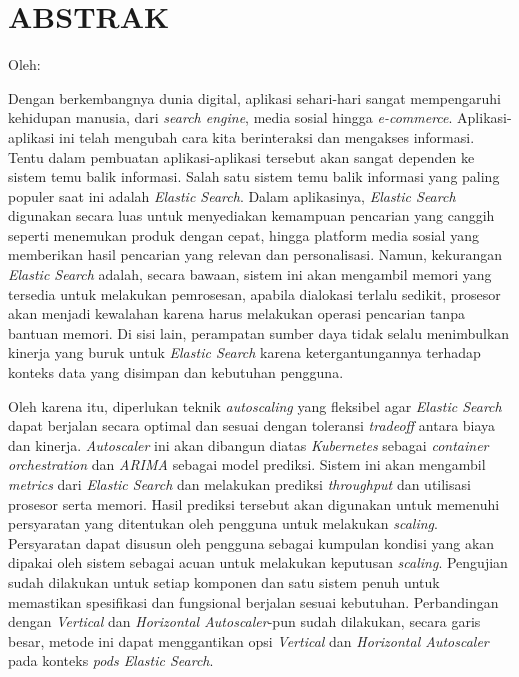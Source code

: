 \clearpage
\chapter*{ABSTRAK}
\begin{center}
    \center
    \begin{singlespace}
      \large\bfseries\MakeUppercase{\thetitle}
  
      \normalfont\normalsize
      Oleh:
  
      \bfseries \theauthor
    \end{singlespace}
\end{center} 

\begin{singlespace}
    \small
    Dengan berkembangnya dunia digital, aplikasi sehari-hari sangat mempengaruhi kehidupan manusia, dari \textit{search engine}, media sosial hingga \textit{e-commerce}. Aplikasi-aplikasi ini telah mengubah cara kita berinteraksi dan mengakses informasi. Tentu dalam pembuatan aplikasi-aplikasi tersebut akan sangat dependen ke sistem temu balik informasi. Salah satu sistem temu balik informasi yang paling populer saat ini adalah \textit{Elastic Search}. Dalam aplikasinya, \textit{Elastic Search} digunakan secara luas untuk menyediakan kemampuan pencarian yang canggih seperti menemukan produk dengan cepat, hingga platform media sosial yang memberikan hasil pencarian yang relevan dan personalisasi. Namun, kekurangan \textit{Elastic Search} adalah, secara bawaan, sistem ini akan mengambil memori yang tersedia untuk melakukan pemrosesan, apabila dialokasi terlalu sedikit, prosesor akan menjadi kewalahan karena harus melakukan operasi pencarian tanpa bantuan memori. Di sisi lain, perampatan sumber daya tidak selalu menimbulkan kinerja yang buruk untuk \textit{Elastic Search} karena ketergantungannya terhadap konteks data yang disimpan dan kebutuhan pengguna.
    
    Oleh karena itu, diperlukan teknik \textit{autoscaling} yang fleksibel agar \textit{Elastic Search} dapat berjalan secara optimal dan sesuai dengan toleransi \textit{tradeoff} antara biaya dan kinerja. \textit{Autoscaler} ini akan dibangun diatas \textit{Kubernetes} sebagai \textit{container orchestration} dan \textit{ARIMA} sebagai model prediksi. Sistem ini akan mengambil \textit{metrics} dari \textit{Elastic Search} dan melakukan prediksi \textit{throughput} dan utilisasi prosesor serta memori. Hasil prediksi tersebut akan digunakan untuk memenuhi persyaratan yang ditentukan oleh pengguna untuk melakukan \textit{scaling}. Persyaratan dapat disusun oleh pengguna sebagai kumpulan kondisi yang akan dipakai oleh sistem sebagai acuan untuk melakukan keputusan \textit{scaling}. Pengujian sudah dilakukan untuk setiap komponen dan satu sistem penuh untuk memastikan spesifikasi dan fungsional berjalan sesuai kebutuhan. Perbandingan dengan \textit{Vertical} dan \textit{Horizontal Autoscaler}-pun sudah dilakukan, secara garis besar, metode ini dapat menggantikan opsi \textit{Vertical} dan \textit{Horizontal Autoscaler} pada konteks \textit{pods Elastic Search}.


\end{singlespace}
